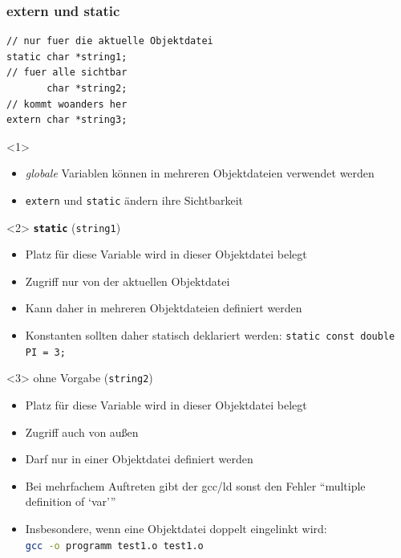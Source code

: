 \documentclass{slides}
\begin{document}
\begin{frame}[fragile]
  \frametitle{extern und static}
\begin{lstlisting}[emph={extern,static}]
// nur fuer die aktuelle Objektdatei
static char *string1;
// fuer alle sichtbar
       char *string2;
// kommt woanders her
extern char *string3;
\end{lstlisting}

  \begin{onlyenv}<1>
    \begin{itemize}
    \item \emph{globale} Variablen können in mehreren Objektdateien verwendet werden
    \item \lstinline!extern! und \lstinline!static! ändern ihre Sichtbarkeit
    \end{itemize}
  \end{onlyenv}

  \begin{onlyenv}<2>
    {\alerted\bfseries \lstinline!static!} (\lstinline!string1!)
    \begin{itemize}
    \item Platz für diese Variable wird in dieser Objektdatei belegt
    \item Zugriff nur von der aktuellen Objektdatei
    \item Kann daher in mehreren Objektdateien definiert werden
    \item Konstanten sollten daher statisch deklariert werden:
      \lstinline!static const double PI = 3;!
    \end{itemize}
  \end{onlyenv}

  \begin{onlyenv}<3>
    ohne Vorgabe (\lstinline!string2!)
    \begin{itemize}
    \item Platz für diese Variable wird in dieser Objektdatei belegt
    \item Zugriff auch von außen
    \item Darf nur in einer Objektdatei definiert werden
    \item Bei mehrfachem Auftreten gibt der gcc/ld sonst den Fehler
      "`multiple definition of `var'"'
    \item Insbesondere, wenn eine Objektdatei doppelt eingelinkt wird:\\
      \lstinline[language=bash]!gcc -o programm test1.o test1.o!
    \end{itemize}
  \end{onlyenv}


\end{frame}
\end{document}
